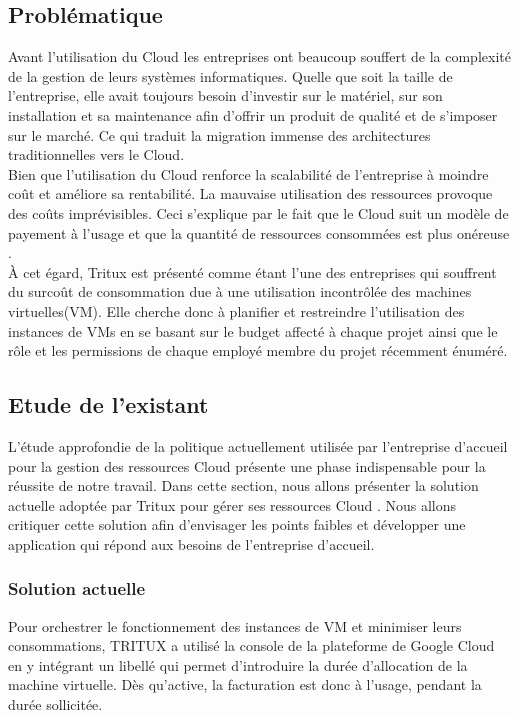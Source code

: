 \subsection{Problématique}
Avant l'utilisation du Cloud les entreprises ont beaucoup souffert de la complexité de la gestion de leurs systèmes informatiques. Quelle que soit la taille de l'entreprise, elle avait toujours besoin d'investir sur le matériel, sur son installation et sa maintenance afin d'offrir un produit de qualité et de s'imposer sur le marché. Ce qui traduit la migration immense des architectures traditionnelles vers le Cloud.\\Bien que l'utilisation du Cloud renforce la scalabilité de l'entreprise à moindre coût et améliore sa rentabilité. La mauvaise utilisation des ressources provoque des coûts imprévisibles. Ceci s'explique par le fait que le Cloud suit un modèle de payement à l'usage et que
la  quantité  de  ressources  consommées est plus  onéreuse
.\\ À  cet  égard, 
Tritux  est  présenté  comme  étant  l'une  des  entreprises  qui  souffrent  du  surcoût  de consommation 
due à une utilisation  incontrôlée des machines virtuelles(VM). Elle cherche donc à planifier et restreindre l'utilisation 
des  instances  de  VMs  en se basant sur  le budget affecté à chaque  projet ainsi que le rôle et les permissions de chaque employé membre du projet récemment énuméré. 
\subsection{Etude de l'existant}
L'étude approfondie de la politique actuellement utilisée par l'entreprise d'accueil pour la gestion des ressources Cloud présente une phase indispensable pour la réussite de notre travail.
Dans cette section,  nous allons présenter  
la  solution  actuelle  adoptée  par  Tritux pour  gérer  ses  ressources Cloud . Nous allons critiquer cette solution afin d'envisager les points faibles et développer une application qui répond aux besoins de l'entreprise d'accueil.
\subsubsection{Solution actuelle}
Pour orchestrer le fonctionnement des instances de VM et minimiser leurs consommations, TRITUX a utilisé la console de la plateforme de Google Cloud en y intégrant un libellé qui permet d'introduire la durée d'allocation de la machine virtuelle. Dès qu'active, la facturation est donc à l'usage, pendant la durée sollicitée.
